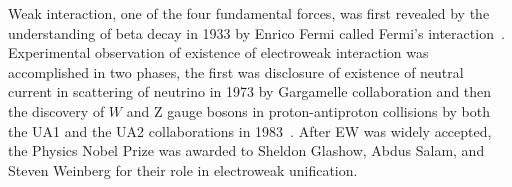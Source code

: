\par Weak interaction, one of the four fundamental forces, was first revealed by the understanding of beta decay in 1933 by Enrico Fermi called Fermi's
interaction~\cite{Referencea}. 
Experimental observation of existence of electroweak interaction was accomplished in two phases, the first was disclosure of existence of neutral current in scattering  of neutrino in 1973 by Gargamelle collaboration and then the discovery of $W$ and Z gauge bosons in proton-antiproton collisions by both the UA1 and the UA2
collaborations in 1983~\cite{Reference2,Reference3,Reference4,Reference5}. After EW was widely accepted, the Physics Nobel Prize was awarded to Sheldon Glashow, Abdus Salam, and Steven Weinberg for their role in electroweak unification.

